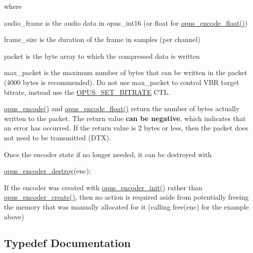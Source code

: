 where 
\begin{DoxyItemize}
\item audio\+\_\+frame is the audio data in opus\+\_\+int16 (or float for \hyperlink{group__opus__encoder_ga4d7243152a1bc6bf4953d1d5c1e530c6}{opus\+\_\+encode\+\_\+float()}) 
\item frame\+\_\+size is the duration of the frame in samples (per channel) 
\item packet is the byte array to which the compressed data is written 
\item max\+\_\+packet is the maximum number of bytes that can be written in the packet (4000 bytes is recommended). Do not use max\+\_\+packet to control V\+BR target bitrate, instead use the \hyperlink{group__opus__encoderctls_ga0bb51947e355b33d0cb358463b5101a7}{O\+P\+U\+S\+\_\+\+S\+E\+T\+\_\+\+B\+I\+T\+R\+A\+TE} C\+TL. 
\end{DoxyItemize}

\hyperlink{group__opus__encoder_gabbb51305050b64614329637d6eff777c}{opus\+\_\+encode()} and \hyperlink{group__opus__encoder_ga4d7243152a1bc6bf4953d1d5c1e530c6}{opus\+\_\+encode\+\_\+float()} return the number of bytes actually written to the packet. The return value {\bfseries can be negative}, which indicates that an error has occurred. If the return value is 2 bytes or less, then the packet does not need to be transmitted (D\+TX).

Once the encoder state if no longer needed, it can be destroyed with


\begin{DoxyCode}
\hyperlink{group__opus__encoder_ga899c69582a1cad2a168aedc99cab7be0}{opus\_encoder\_destroy}(enc);
\end{DoxyCode}


If the encoder was created with \hyperlink{group__opus__encoder_ga363e90db0f434b2d8fde7dcf989270b1}{opus\+\_\+encoder\+\_\+init()} rather than \hyperlink{group__opus__encoder_ga8a145618886fed2d6fbc79a4071a939d}{opus\+\_\+encoder\+\_\+create()}, then no action is required aside from potentially freeing the memory that was manually allocated for it (calling free(enc) for the example above) 

\subsection{Typedef Documentation}
\mbox{\label{group__opus__encoder_gaf461a3ef2f10c2fe8b994a176f06c9bd}} 
